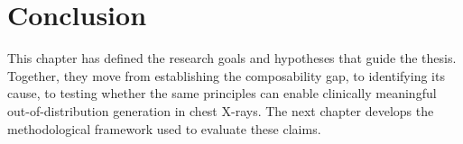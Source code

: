 
\section{Conclusion}
\label{sec:research_objectives_conclusion}
This chapter has defined the research goals and hypotheses that guide the thesis. Together, they move from establishing the composability gap, to identifying its cause, to testing whether the same principles can enable clinically meaningful out-of-distribution generation in chest X-rays. The next chapter develops the methodological framework used to evaluate these claims.
